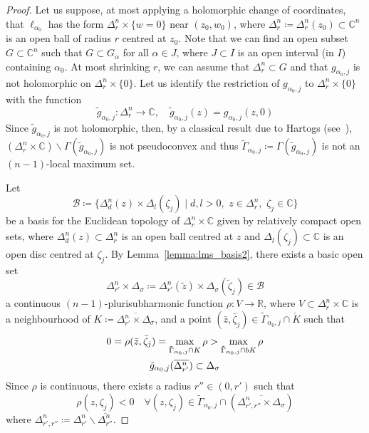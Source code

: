 \documentclass[reqno,oneside]{amsart}
\newcommand{\numberset}{\mathbb}
\newcommand{\R}{\numberset{R}}
\newcommand{\C}{\numberset{C}}
\theoremstyle{definition}
\theoremstyle{plain}
\theoremstyle{remark}
\begin{document}
\begin{proof}
    Let us suppose, at most applying a holomorphic change of coordinates, that $\ell_{\alpha_0}$ has the form $\Delta_r^n\times\{w=0\}$ near $(z_0,w_0)$, where $\Delta_r^n\coloneqq\Delta_r^n(z_0)\subset\C^n$ is an open ball of radius $r$ centred at $z_0$. Note that we can find an open subset $G\subset\C^n$ such that $G\subset G_\alpha$ for all $\alpha\in J$, where $J\subset I$ is an open interval (in $I$) containing $\alpha_0$. At most shrinking $r$, we can assume that $\Delta_r^n\subset G$ and that $g_{\alpha_0,j}$ is not holomorphic on $\Delta_r^n\times\{0\}$. Let us identify the restriction of $g_{\alpha_0,j}$ to $\Delta_r^n\times\{0\}$ with the function
    \[
        \tilde{g}_{\alpha_0,j}:\Delta_r^n\to\C, \quad \tilde{g}_{\alpha_0,j}(z)=g_{\alpha_0,j}(z,0)
    \]
    Since $\tilde{g}_{\alpha_0,j}$ is not holomorphic, then, by a classical result due to Hartogs (see~\cite[Theorem~1.1]{pawl_shcher:foliations}), $(\Delta_r^n\times\C)\smallsetminus\Gamma(\tilde{g}_{\alpha_0,j})$ is not pseudoconvex and thus $\tilde\Gamma_{\alpha_0,j}\coloneqq\Gamma(\tilde{g}_{\alpha_0,j})$ is not an $(n-1)$-local maximum set.

    Let
    \[
        \mathcal{B}\coloneqq\{\Delta_d^n(z)\times\Delta_l(\zeta_j) \mid d,l>0, \,\, z\in\Delta_r^n, \,\, \zeta_j\in\C\}
    \]
    be a basis for the Euclidean topology of $\Delta_r^n\times\C$ given by relatively compact open sets, where $\Delta_d^n(z)\subset\Delta_r^n$ is an open ball centred at $z$ and $\Delta_l(\zeta_j)\subset\C$ is an open disc centred at $\zeta_j$. By Lemma~\ref{lemma:lms_basis2}, there exists a basic open set
    \[
        \Delta_{r'}^n\times\Delta_\sigma\coloneqq\Delta_{r'}^n(\tilde{z})\times\Delta_\sigma(\tilde\zeta_j)\in\mathcal{B}
    \]
    a continuous $(n-1)$-plurisubharmonic function $\rho:V\to\R$, where $V\subset\Delta_r^n\times\C$ is a neighbourhood of $K\coloneqq\overline{\Delta_{r'}^n\times\Delta_\sigma}$, and a point $(\bar{z},\bar\zeta_j)\in\tilde\Gamma_{\alpha_0,j}\cap\mathring{K}$ such that
    \begin{gather}
    	0=\rho(\bar{z},\bar\zeta_j)=\max_{\tilde\Gamma_{\alpha_0,j}\cap K} \rho>\max_{\tilde\Gamma_{\alpha_0,j}\cap bK} \rho \notag \\
    	\tilde{g}_{\alpha_0,j}(\overline{\Delta_{r'}^n})\subset\Delta_\sigma \label{eq:inclusion}
    \end{gather}
    Since $\rho$ is continuous, there exists a radius $r''\in(0,r')$ such that
    \begin{equation}
    \label{eq:negativity}
        \rho(z,\zeta_j)<0 \quad \forall(z,\zeta_j)\in\tilde\Gamma_{\alpha_0,j}\cap(\overline{\Delta_{r',r''}^n\times\Delta_\sigma})
    \end{equation}
    where $\Delta_{r',r''}^n\coloneqq\Delta_{r'}^n\smallsetminus\overline{\Delta_{r''}^n}$.


\end{proof}
\end{document}
